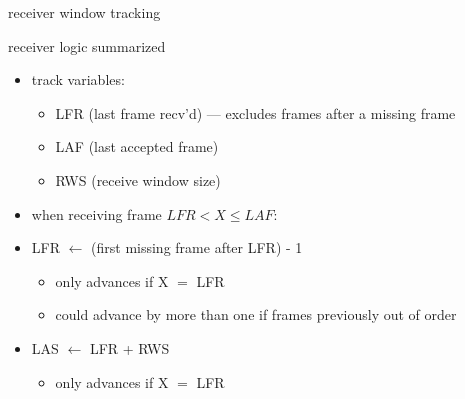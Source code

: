 \begin{frame}{receiver window tracking}
\end{frame}

\begin{frame}{receiver logic summarized}
\begin{itemize}
\item track variables:
    \begin{itemize}
    \item LFR (last frame recv'd) --- excludes frames after a missing frame
    \item LAF (last accepted frame)
    \item RWS (receive window size)
    \end{itemize}
\item when receiving frame $LFR < X \le LAF$:
\item LFR $\leftarrow$ (first missing frame after LFR) - 1
    \begin{itemize}
    \item only advances if X $=$ LFR
    \item could advance by more than one if frames previously out of order
    \end{itemize}
\item LAS $\leftarrow$ LFR + RWS
    \begin{itemize}
    \item only advances if X $=$ LFR
    \end{itemize}
\end{itemize}
\end{frame}
